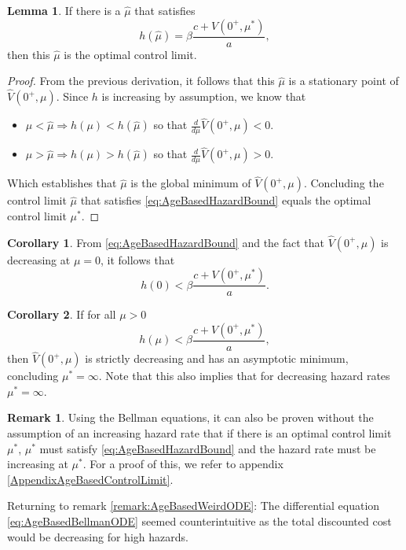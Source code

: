 \documentclass[a4paper]{thesis}
\theoremstyle{definition}
\newtheorem{remark}{Remark}[chapter]
\newtheorem{corollary}{Corollary}[chapter]
\newtheorem{lemma}{Lemma}[chapter]  %
\providecommand{\DIFaddbegin}{} %
\providecommand{\DIFaddend}{} %
\newcommand{\DIFaddincludegraphics}[2][]{{\color{blue}\fbox{\DIFOincludegraphics[#1]{#2}}}} %
\DeclareRobustCommand{\DIFaddbegin}{\DIFOaddbegin \let\includegraphics\DIFaddincludegraphics} %
\DeclareRobustCommand{\DIFaddend}{\DIFOaddend \let\includegraphics\DIFOincludegraphics} %
\begin{document}
	\begin{lemma}\DIFaddbegin \label{lemma:AgeBasedControlLimit}
		\DIFaddend If there is a $\hat{\mu}$ that satisfies
		\begin{equation}\label{eq:AgeBasedHazardBound}
		h(\hat{\mu})=\beta\frac{c+V(0^+,\mu^*)}{a},
		\end{equation}
		then this $\hat{\mu}$ is the optimal control limit.
		\begin{proof}
			From the previous derivation, it follows that this $\hat{\mu}$ is a stationary point of $\hat{V}(0^+,\mu)$.
			Since $h$ is increasing by assumption, we know that
			\begin{itemize}
				\item $\mu<\hat{\mu}\Rightarrow h(\mu)<h(\hat{\mu})$ so that $\frac{d}{d\mu}\hat{V}(0^+,\mu)<0$.
				\item $\mu>\hat{\mu}\Rightarrow h(\mu)>h(\hat{\mu})$ so that $\frac{d}{d\mu}\hat{V}(0^+,\mu)>0$.
			\end{itemize}
			Which establishes that $\hat{\mu}$ is the global minimum of $\hat{V}(0^+,\mu)$.
			Concluding the control limit $\hat{\mu}$ that satisfies \eqref{eq:AgeBasedHazardBound} equals the optimal control limit $\mu^*$.
		\end{proof}
	\end{lemma}
	\begin{corollary}
		From \eqref{eq:AgeBasedHazardBound} and the fact that $\hat{V}(0^+,\mu)$ is decreasing at $\mu=0$, it follows that
		\[
		h(0)<\beta\frac{c+V(0^+,\mu^*)}{a}.
		\]
	\end{corollary}
	\begin{corollary}
		If for all $\mu>0$
		\[
		h(\mu)<\beta\frac{c+V(0^+,\mu^*)}{a},
		\]
		then $\hat{V}(0^+,\mu)$ is strictly decreasing and has an asymptotic minimum, concluding $\mu^*=\infty$.
		Note that this also implies that for decreasing hazard rates $\mu^*=\infty$.
	\end{corollary}
	
	\begin{remark}
		Using the Bellman equations, it can also be proven without the assumption of an increasing hazard rate that if there is an optimal control limit $\mu^*$, $\mu^*$ must satisfy \eqref{eq:AgeBasedHazardBound} and the hazard rate must be increasing at $\mu^*$.
		For a proof of this, we refer to appendix \ref{AppendixAgeBasedControlLimit}.
	\end{remark}
	
	Returning to remark \ref{remark:AgeBasedWeirdODE}:
	The differential equation \eqref{eq:AgeBasedBellmanODE} seemed counterintuitive as the total discounted cost would be decreasing for high hazards.
	
\end{document}
